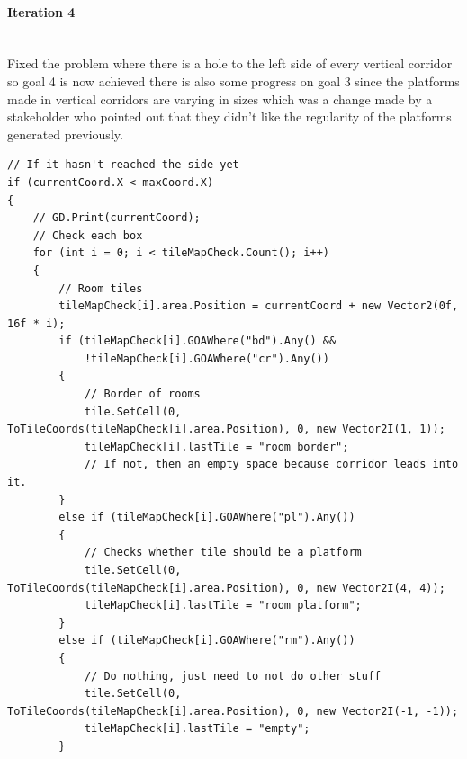 \documentclass{article}
\newcommand{\myparagraph}[1]{\paragraph{#1}\mbox{}\\} %
\begin{document}
\myparagraph{Iteration 4}
Fixed the problem where there is a hole to the left side of every vertical corridor so goal 4 is now achieved there is also some progress on goal 3 since the platforms made in vertical corridors are varying in sizes which was a change made by a stakeholder who pointed out that they didn't like the regularity of the platforms generated previously. 
\begin{lstlisting}
// If it hasn't reached the side yet
if (currentCoord.X < maxCoord.X)
{
    // GD.Print(currentCoord);
    // Check each box
    for (int i = 0; i < tileMapCheck.Count(); i++)
    {
        // Room tiles
        tileMapCheck[i].area.Position = currentCoord + new Vector2(0f, 16f * i);
        if (tileMapCheck[i].GOAWhere("bd").Any() &&
            !tileMapCheck[i].GOAWhere("cr").Any())
        {
            // Border of rooms
            tile.SetCell(0, ToTileCoords(tileMapCheck[i].area.Position), 0, new Vector2I(1, 1));
            tileMapCheck[i].lastTile = "room border";
            // If not, then an empty space because corridor leads into it.   
        }
        else if (tileMapCheck[i].GOAWhere("pl").Any())
        {
            // Checks whether tile should be a platform
            tile.SetCell(0, ToTileCoords(tileMapCheck[i].area.Position), 0, new Vector2I(4, 4));
            tileMapCheck[i].lastTile = "room platform";
        }
        else if (tileMapCheck[i].GOAWhere("rm").Any())
        {
            // Do nothing, just need to not do other stuff
            tile.SetCell(0, ToTileCoords(tileMapCheck[i].area.Position), 0, new Vector2I(-1, -1));
            tileMapCheck[i].lastTile = "empty";
        }


\end{lstlisting}
\end{document}
